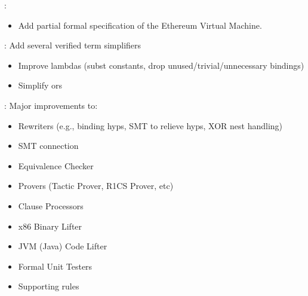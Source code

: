 \begin{frame}

\implibtitle

:
\begin{itemize}
\item Add partial formal specification of the Ethereum Virtual Machine.
\end{itemize}

\end{frame}


\begin{frame}

\implibtitle

: Add several verified term simplifiers
\begin{itemize}
\item Improve lambdas (subst constants, drop unused/trivial/unnecessary bindings)
\item Simplify ors
\end{itemize}

\end{frame}


\begin{frame}

\implibtitle

: Major improvements to:
\begin{itemize}
\item Rewriters (e.g., binding hyps, SMT to relieve hyps, XOR nest handling)
\item SMT connection
\item Equivalence Checker
\item Provers (Tactic Prover, R1CS Prover, etc)
\item Clause Processors
\item x86 Binary Lifter
\item JVM (Java) Code Lifter
\item Formal Unit Testers
\item Supporting rules
\end{itemize}

\end{frame}


